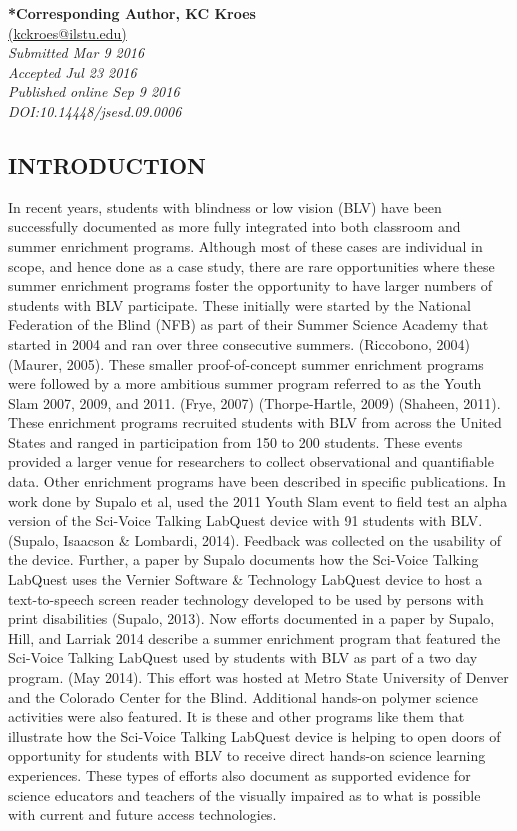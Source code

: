 \documentclass[11.5pt]{sig-alternate} %
\begin{document}
\textbf{*Corresponding Author, KC Kroes}\\
\href{mailto: kckroes@ilstu.edu }{(kckroes@ilstu.edu)} \\
\textit{Submitted  Mar 9 2016}\\
\textit{Accepted Jul 23 2016} \\
\textit{Published online Sep 9 2016} \\
\textit{DOI:10.14448/jsesd.09.0006} \\
\pagebreak
\clearpage
\begin{large}
\section*{INTRODUCTION}

In recent years, students with blindness or low vision (BLV) have been successfully documented as more fully integrated into both classroom and summer enrichment programs. Although most of these cases are individual in scope, and hence done as a case study, there are rare opportunities where these summer enrichment programs foster the opportunity to have larger numbers of students with BLV participate. These initially were started by the National Federation of the Blind (NFB) as part of their Summer Science Academy that started in 2004 and ran over three consecutive summers. (Riccobono, 2004) (Maurer, 2005). These smaller proof-of-concept summer enrichment programs were followed by a more ambitious summer program referred to as the Youth Slam 2007, 2009, and 2011. (Frye, 2007) (Thorpe-Hartle, 2009) (Shaheen, 2011). These enrichment programs recruited students with BLV from across the United States and ranged in participation from 150 to 200 students. These events provided a larger venue for researchers to collect observational and quantifiable data. Other enrichment programs have been described in specific publications. In work done by Supalo et al, used the 2011 Youth Slam event to field test an alpha version of the Sci-Voice Talking LabQuest device with 91 students with BLV. (Supalo, Isaacson \& Lombardi, 2014). Feedback was collected on the usability of the device. Further, a paper by Supalo documents how the Sci-Voice Talking LabQuest uses the Vernier Software \& Technology LabQuest device to host a text-to-speech screen reader technology developed to be used by persons with print disabilities (Supalo, 2013). Now efforts documented in a paper by Supalo, Hill, and Larriak 2014 describe a summer enrichment program that featured the Sci-Voice Talking LabQuest used by students with BLV as part of a two day program. (May 2014). This effort was hosted at Metro State University of Denver and the Colorado Center for the Blind. Additional hands-on polymer science activities were also featured. It is these and other programs like them that illustrate how the Sci-Voice Talking LabQuest device is helping to open doors of opportunity for students with BLV to receive direct hands-on science learning experiences. These types of efforts also document as supported evidence for science educators and teachers of the visually impaired as to what is possible with current and future access technologies. 


\end{large}
\end{document}

